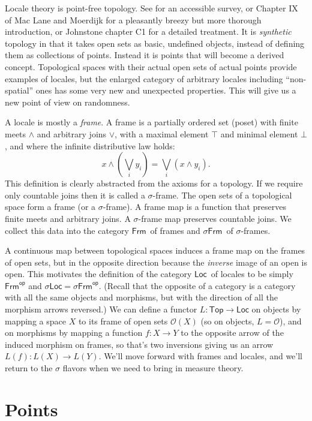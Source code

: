 \documentclass[12pt]{extarticle}
\newcommand{\op}[1]{#1^{\textsf{op}}}
\newcommand{\bottom}{\ensuremath{\bot}}
\newcommand{\Frm}{\ensuremath{\mathsf{Frm}}}
\newcommand{\sFrm}{\ensuremath{\mathsf{\sigma Frm}}}
\newcommand{\Locale}{\ensuremath{\mathsf{Loc}}}
\newcommand{\Topcat}{\ensuremath{\mathsf{Top}}}
\newcommand{\slocale}{\ensuremath{\mathsf{\sigma Loc}}}
\renewcommand{\o}{\ensuremath{\mathcal{O}}}
\begin{document}
Locale theory is point-free topology. See \cite{johnstone1983} for an accessible survey, or Chapter IX of Mac Lane and Moerdijk \cite{maclane} for a pleasantly breezy but more thorough introduction, or Johnstone \cite{sketches} chapter C1 for a detailed treatment. It is \emph{synthetic} topology in that it takes open sets as basic, undefined objects, instead of defining them as collections of points. Instead it is points that will become a derived concept. Topological spaces with their actual open sets of actual points provide examples of locales, but the enlarged category of arbitrary locales including ``non-spatial'' ones has some very new and unexpected properties. This will give us a new point of view on randomness.

A locale is mostly a \emph{frame}. A frame is a partially ordered set (poset) with finite meets $\wedge$ and arbitrary joins $\vee$, with a maximal element $\top$ and minimal element $\bottom$, and where the infinite distributive law holds: $$x \wedge (\bigvee_i y_i)=\bigvee_i (x\wedge y_i).$$ This definition is clearly abstracted from the axioms for a topology. If we require only countable joins then it is called a $\sigma$-frame. The open sets of a topological space form a frame (or a $\sigma$-frame). A frame map is a function that preserves finite meets and arbitrary joins. A $\sigma$-frame map preserves countable joins. We collect this data into the category \Frm\ of frames and \sFrm\ of $\sigma$-frames.

A continuous map between topological spaces induces a frame map on the frames of open sets, but in the opposite direction because the \emph{inverse} image of an open is open. This motivates the definition of the category \Locale\ of locales to be simply $\op{\Frm}$ and $\slocale=\op{\sFrm}$. (Recall that the opposite of a category is a category with all the same objects and morphisms, but with the direction of all the morphism arrows reversed.) We can define a functor $L:\Topcat\to\Locale$ on objects by mapping a space $X$ to its frame of open sets $\o(X)$ (so on objects, $L=\o$), and on morphisms by mapping a function $f:X\to Y$ to the opposite arrow of the induced morphism on frames, so that's two inversions giving us an arrow $L(f):L(X)\to L(Y)$. We'll move forward with frames and locales, and we'll return to the $\sigma$ flavors when we need to bring in measure theory.

\section{Points}
\end{document}
